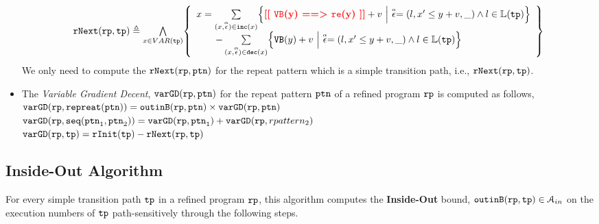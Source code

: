 \begin{itemize}
%
\[
  \begin{array}{l}
  \rfnext(\rprog, \tpath) \triangleq 
  \bigwedge\limits_{x \in VAR(\tpath)}
  \left\{ 
    \begin{array}{l}
  x =   \sum\limits_{(x, \absevent) \in \inc(x) }
  \left\{ 
    \todo{\varinvar(y) ==> \reset(y)}+ v ~\middle\vert~ \absevent = (l, x' \leq y + v, \_) \land l \in \lvar(\tpath)\right\}
    \\ \qquad 
    - \sum\limits_{(x, \absevent) \in \dec(x) }\left\{ 
      \varinvar(y) + v ~\middle\vert~ \absevent = (l, x' \leq y + v, \_) \land l \in \lvar(\tpath) \right\}
    \end{array}
  \right\}
  \end{array}
\]
We only need to compute the $\mathtt{rNext}(\mathtt{rp}, \mathtt{ptn})$ for the repeat pattern which is a simple transition path,
i.e., $\mathtt{rNext}(\mathtt{rp}, \mathtt{tp})$.
\item  The \emph{Variable Gradient Decent}, $\mathtt{varGD}(\mathtt{rp}, \mathtt{ptn})$ for the repeat pattern $\mathtt{ptn}$ of a refined program $\mathtt{rp}$ is computed as follows,
\\
{$\mathtt{varGD}(\mathtt{rp}, \mathtt{repreat}(\mathtt{ptn})) =  \mathtt{outinB}(\mathtt{rp}, \mathtt{ptn}) \times {\ensuremath{\mathtt{varGD}}(\ensuremath{\mathtt{rp}}, \ensuremath{\mathtt{ptn}})}$}
\\
$\mathtt{varGD}(\mathtt{rp}, \mathtt{seq}(\mathtt{ptn}_1, \mathtt{ptn}_2)) =  \mathtt{varGD}(\mathtt{rp}, \mathtt{ptn}_1)+ \mathtt{varGD}(\mathtt{rp}, rpattern_2)$
\\
$\mathtt{varGD}(\mathtt{rp}, \mathtt{tp}) =  \mathtt{rInit}(\mathtt{tp}) - \mathtt{rNext}(\mathtt{rp}, \mathtt{tp})$
\end{itemize}
%
\subsection{Inside-Out Algorithm}
\label{sec:pathsensitive_rb-inoutalg}
For every simple transition path $\mathtt{tp}$ in a refined program $\mathtt{rp}$, 
this algorithm
computes the \textbf{Inside-Out} bound, $\mathtt{outinB}(\mathtt{rp}, \mathtt{tp}) \in \mathcal{A}_{in}$
on the execution numbers of $\mathtt{tp}$ path-sensitively
through the following steps.


